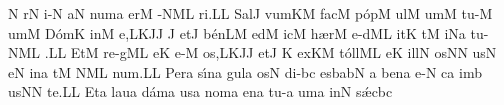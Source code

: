 \spatium
\custos N
\lineaproxima
{}r\punctum N\egn
\sgn {}i-\punctum N\egn
\sgn {}a{}\punctum N\egn
\spatium
\sgn num\punctum a\egn
\sgn {}er\punctum M\egn
{}-\climacus NML\egn
\sgn ri.\punctum L\augmentum L\egn
\spatium\divisiofinalis\spatium
\sgn Sal\punctum J\egn
\sgn vum\pes KM\egn
\spatium
\sgn fac\punctum M\egn
\spatium
\sgn p{\'o}p\punctum M\egn
%
\sgn {}ul\punctum M\egn
\sgn {}um\punctum M\egn
\spatium
\sgn tu-\punctum M\egn
\sgn {}um\punctum M\egn
\spatium
\sgn D{\'o}m\punctum K\egn
\sgn {}in\punctum M\egn
\sgn {}e,\climacus LKJ\augmentum J\egn
\spatium\divisiominor\spatium
\custos J
\lineaproxima
\sgn {}et\punctum J\egn
\spatium
\sgn b{\'e}n\pes LM\egn
\sgn {}ed\punctum M\egn
\sgn {}ic\punctum M\egn
\spatium
\sgn h{\ae}r\punctum M\egn
\sgn {}e{-d}\clivis ML\egn
\sgn {}it\punctum K\egn
{}t\punctum M\egn
\sgn {}i{}\pes Na\egn
\spatium
\sgn tu-\climacus NML\egn
\sgn {}{\ae}.\punctum L\augmentum L\egn
\spatium\divisiofinalis\spatium
%
\sgn {}Et\punctum M\egn
\spatium
\sgn re{-g}\clivis ML\egn
\sgn {}e{}\punctum K\egn
\spatium
\sgn {}e-\punctum M\egn
\sgn {}o{s,}\climacus LKJ\augmentum J\egn
\spatium\divisiominor\spatium
\sgn {}et\punctum J\egn
\spatium
\custos K
\lineaproxima
\sgn {}ex\pes KM\egn
\sgn t{\'o}{ll}\clivis ML\egn
\sgn {}e{}\punctum K\egn
\spatium
\sgn {}i{ll}\punctum N\egn
\sgn {}os\punctum N\augmentum N\egn
\spatium\divisiominima\spatium
\sgn {}us\punctum N\egn
{}e{}\punctum N\egn
\spatium
\sgn {}in\punctum a\egn
\spatium
\sgn {}{\ae}t\punctum M\egn
{}\climacus NML\egn
\sgn nu{m.}\punctum L\augmentum L\egn
\spatium\divisiofinalis\spatium
\sgn Per\punctum a\egn
\spatium\sgn s{\'\i}n\punctum a\egn
\sgn gul\punctum a\egn
\sgn {}os\punctum N\egn
\spatium
\sgn di-\pes bc\egn
\sgn {}es\clivis ba\augmentumduplex bN\egn
\spatium\divisiominor\spatium
\custos a
\lineaproxima
\sgn ben\punctum a\egn
\sgn {}e{-}\punctum N\egn
{}c\punctum a\egn
\sgn {}im\punctum b\egn
\sgn {}us\punctum N\augmentum N\egn
\spatium
\sgn te.\punctum L\augmentum L\egn
\spatium\divisiofinalis\spatium
\sgn {}Et\punctum a\egn
\spatium\sgn lau\punctum a\egn
\sgn d{\'a}m\punctum a\egn
\sgn {}us\punctum a\egn
\spatium
\sgn nom\punctum a\egn
\sgn {}en\punctum a\egn
\spatium
\sgn tu-\punctum a\egn
\sgn {}um\punctum a\egn
\spatium
\sgn {}in\punctum N\egn
\spatium
\sgn s{\'\ae}c\pes bc\egn
